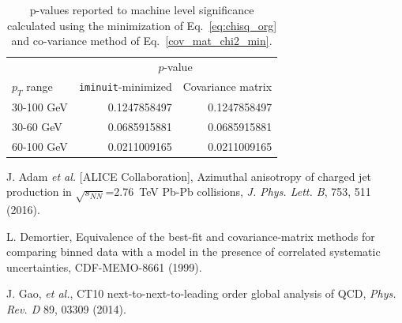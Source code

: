 \documentclass[11pt]{article}
\begin{document}
\begin{table}[h]
\begin{center}
\begin{tabular}{ l r r }
  & \multicolumn{2}{c}{$p$-value} \\
$p_T$ range & \texttt{iminuit}-minimized & Covariance matrix \\
\hline
30-100 GeV & 0.1247858497 & 0.1247858497 \\ 
30-60 GeV & 0.0685915881 & 0.0685915881 \\ 
60-100 GeV & 0.0211009165 & 0.0211009165 \\
\end{tabular}
\caption{p-values reported to machine level significance calculated using the minimization of Eq.~\ref{eq:chisq_org} and co-variance method of Eq.~\ref{cov_mat_chi2_min}.}
\end{center}
\end{table}


\begin{thebibliography}{10}

 J. Adam {\it et al.} [ALICE Collaboration], Azimuthal anisotropy of charged jet production in $\sqrt{s_{NN}}$=2.76~TeV Pb-Pb collisions, {\it J. Phys. Lett. B}, 753, 511 (2016).

 L. Demortier, Equivalence of the best-fit and covariance-matrix methods for comparing binned data with a model in the presence of correlated systematic uncertainties, CDF-MEMO-8661 (1999).

 J. Gao, {\it et al.}, CT10 next-to-next-to-leading order global analysis of QCD, {\it Phys. Rev. D} 89, 03309 (2014).

\end{thebibliography}
\end{document}
